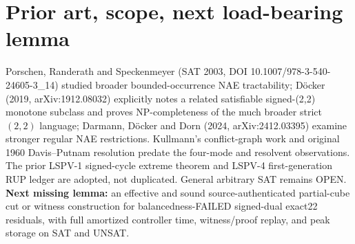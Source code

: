 \documentclass[10pt]{article}
\begin{document}
\section{Prior art, scope, next load-bearing lemma}
Porschen, Randerath and Speckenmeyer (SAT 2003, DOI 10.1007/978-3-540-24605-3\_14) studied broader bounded-occurrence NAE tractability; D\"ocker (2019, arXiv:1912.08032) explicitly notes a related satisfiable signed-(2,2) monotone subclass and proves NP-completeness of the much broader strict $(2,2)$ language; Darmann, D\"ocker and Dorn (2024, arXiv:2412.03395) examine stronger regular NAE restrictions. Kullmann's conflict-graph work and original 1960 Davis--Putnam resolution predate the four-mode and resolvent observations. The prior LSPV-1 signed-cycle extreme theorem and LSPV-4 first-generation RUP ledger are adopted, not duplicated. General arbitrary SAT remains OPEN. \textbf{Next missing lemma:} an effective and sound source-authenticated partial-cube cut or witness construction for balancedness-FAILED signed-dual exact22 residuals, with full amortized controller time, witness/proof replay, and peak storage on SAT and UNSAT.
\end{document}
